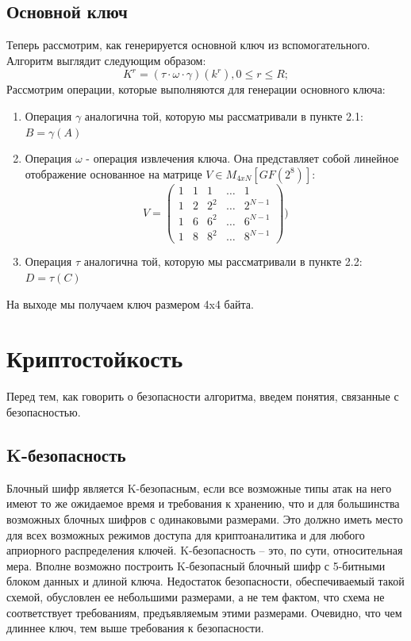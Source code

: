 \documentclass[12pt]{article}
\begin{document}
\subsection{Основной ключ}
Теперь рассмотрим, как генерируется основной ключ из вспомогательного. Алгоритм выглядит следующим образом:
\[K^{r} = (\tau \cdot \omega \cdot \gamma)(k^{r}), 0 \leq r \leq R;\]
\newline
Рассмотрим операции, которые выполняются для генерации основного ключа:
\begin{enumerate}
    \item Операция $\gamma$ аналогична той, которую мы рассматривали в пункте 2.1: $B = \gamma(A)$
    \item Операция $\omega$ - операция извлечения ключа. Она представляет собой линейное отображение основанное на матрице $V \in M_{4xN}[GF(2^{8})]$:
    \[V = \left(
        \begin{array}{ccccc}
        1 & 1 & 1 & \ldots & 1\\
        1 & 2 & 2^{2} & \ldots & 2^{N-1}\\
        1 & 6 & 6^{2} & \ldots & 6^{N-1}\\
        1 & 8 & 8^{2} & \ldots & 8^{N-1}
        \end{array}
    \right))\]
    \item Операция $\tau$ аналогична той, которую мы рассматривали в пункте 2.2: $D = \tau(C)$
\end{enumerate}
\newline
На выходе мы получаем ключ размером 4x4 байта.


\section{Криптостойкость}
Перед тем, как говорить о безопасности алгоритма, введем понятия, связанные с безопасностью.

\subsection{K-безопасность}
Блочный шифр является K-безопасным, если все возможные типы атак на него имеют то же ожидаемое время и требования к хранению, что и для большинства возможных блочных шифров с одинаковыми размерами. Это должно иметь место для всех возможных режимов доступа для криптоаналитика и для любого априорного распределения ключей.
K-безопасность -- это, по сути, относительная мера. Вполне возможно построить K-безопасный блочный шифр с 5-битными блоком данных и длиной ключа. Недостаток безопасности, обеспечиваемый такой схемой, обусловлен ее небольшими размерами, а не тем фактом, что схема не соответствует требованиям, предъявляемым этими размерами. Очевидно, что чем длиннее ключ, тем выше требования к безопасности.
\end{document}
